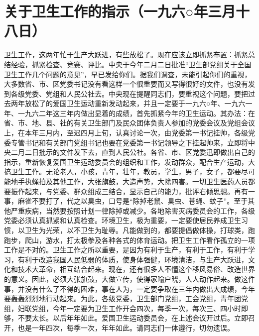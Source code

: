 \section[关于卫生工作的指示（一九六○年三月十八日）]{关于卫生工作的指示（一九六○年三月十八日）}


卫生工作，这两年忙于生产大跃进，有些放松了。现在应该立即抓紧布置：抓紧总结经验，抓紧检查、竞赛、评比。中央于今年二月二日批准“卫生部党组关于全国卫生工作几个问题的意见”，早已发给你们。据我们调查，未能引起你们的重视，大多数省、市、区党委书记没有看这样一个很重要而又写得很好的文件，也没有发到各级党委、党组和人民公社去。中央现在提醒同志们，要重视这个问题，要把过去两年放松了的爱国卫生运动重新发动起来，并且一定要于一九六○年、一九六一年、一九六二年这三年内做出显着的成绩，首先抓紧今年的卫生运动。其办法：在省、市、地、县、社的有关卫生部门及民众团体负责人参加的党委会议及党组会议上，在本年三月内，至迟四月上旬，认真讨论一次，由党委第一书记挂帅，各级党委专管书记和有关部门党组书记也要在党委第一书记领导之下挂起帅来，立即将中央二月二日批示的文件发下去，直到人民公社。各省、市、区党委迅即做出自己的指示，重新恢复爱国卫生运动委员会的组织和工作，发动群众，配合生产运动，大搞卫生工作。无论老人，小孩，青年，壮年，教员，学生，男子，女子，都要尽可能地手执蝇拍及其他工作，大张旗鼓，大造声势，大除四害。一切卫生医药人员都要振作起来，与党委、群众组成三结合，显示自己的能力，批评右倾思想。再有一事，麻雀不要打了，代之以臭虫，口号是“除掉老鼠、臭虫、苍蝇、蚊子”。至于其他严重疾病，当然要按照计划一律除掉或减少。各地除害灭病委员会的工作，各级党委必须认真抓紧和认真检查。环境卫生，极为重要，一定要使居民养成卫生习惯，以卫生为光荣，以不卫生为耻辱。凡能做到的，都要提倡做体操，打球类，跑跑步，爬山，游水，打太极拳及各种各式的体育运动。把卫生工作看作孤立的一项工作是不对的。卫生工作之所以重要，是因为有利于生产，有利于工作，有利于学习，有利于改造我国人民低弱的体质，使身体强健，环境清洁，与生产大跃进，文化和技术大革命，相互结合起来。现在，还有很多人不懂这个移风易俗、改造世界的意义。因此，必须大张旗鼓，大做宣传，使得家喻户晓，人人动作起来。做这件事，并没有什么了不得的困难，事在人为，一定要争取在三年内做出大成绩，今年要轰轰烈烈地行动起来。为此，各级党委，卫生部门党组，工会党组，青年团党组，妇联党组，今年一定要为卫生工作开会四次，每季一次，每次三、四小时即够，不要太长。以后年年如此。爱国卫生运动委员会，在上述会议开过后。立即召开，也是一年四次，每季一次，年年如此。请同志们一体遵行，切勿遗误。


